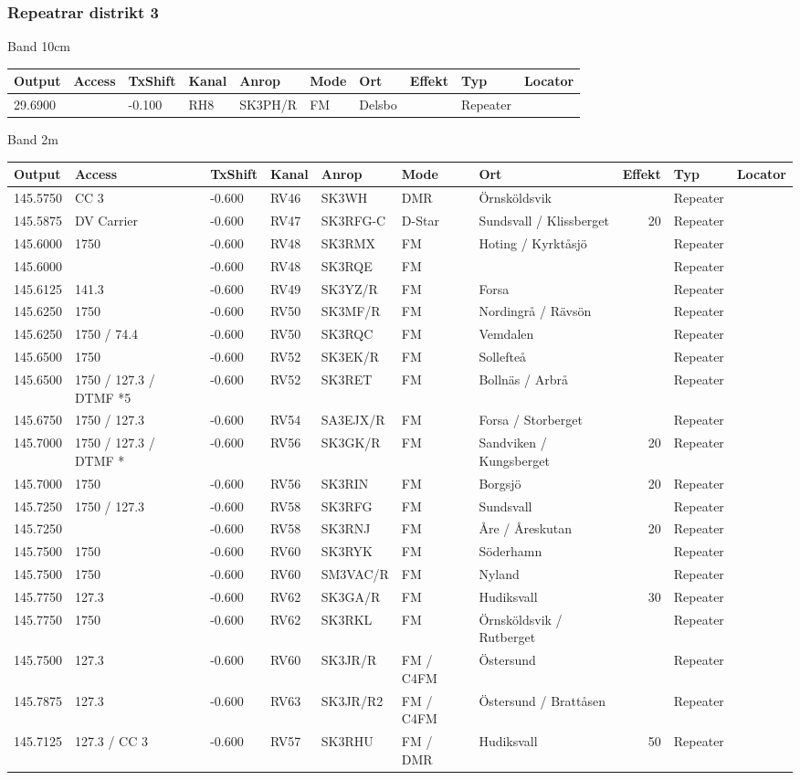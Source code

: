 \subsubsection{Repeatrar distrikt 3}
\large{Band 10cm}
\begin{longtable}{lllllllrlr}
Output & Access & TxShift & Kanal & Anrop & Mode & Ort & Effekt & Typ & Locator \\ \hline
29.6900&&-0.100&RH8&SK3PH/R&FM&Delsbo&&Repeater&\\
\end{longtable}
\large{Band 2m}
\begin{longtable}{lllllllrlr}
Output & Access & TxShift & Kanal & Anrop & Mode & Ort & Effekt & Typ & Locator \\ \hline
145.5750&CC 3&-0.600&RV46&SK3WH&DMR&Örnsköldsvik&&Repeater&\\
145.5875&DV Carrier&-0.600&RV47&SK3RFG-C&D-Star&Sundsvall / Klissberget&20&Repeater&\\
145.6000&1750&-0.600&RV48&SK3RMX&FM&Hoting / Kyrktåsjö&&Repeater&\\
145.6000&&-0.600&RV48&SK3RQE&FM&&&Repeater&\\
145.6125&141.3&-0.600&RV49&SK3YZ/R&FM&Forsa&&Repeater&\\
145.6250&1750&-0.600&RV50&SK3MF/R&FM&Nordingrå / Rävsön&&Repeater&\\
145.6250&1750 / 74.4&-0.600&RV50&SK3RQC&FM&Vemdalen&&Repeater&\\
145.6500&1750&-0.600&RV52&SK3EK/R&FM&Sollefteå&&Repeater&\\
145.6500&1750 / 127.3 / DTMF *5&-0.600&RV52&SK3RET&FM&Bollnäs / Arbrå&&Repeater&\\
145.6750&1750 / 127.3&-0.600&RV54&SA3EJX/R&FM&Forsa / Storberget&&Repeater&\\
145.7000&1750 / 127.3 / DTMF *&-0.600&RV56&SK3GK/R&FM&Sandviken / Kungsberget&20&Repeater&\\
145.7000&1750&-0.600&RV56&SK3RIN&FM&Borgsjö&20&Repeater&\\
145.7250&1750 / 127.3&-0.600&RV58&SK3RFG&FM&Sundsvall&&Repeater&\\
145.7250&&-0.600&RV58&SK3RNJ&FM&Åre / Åreskutan&20&Repeater&\\
145.7500&1750&-0.600&RV60&SK3RYK&FM&Söderhamn&&Repeater&\\
145.7500&1750&-0.600&RV60&SM3VAC/R&FM&Nyland&&Repeater&\\
145.7750&127.3&-0.600&RV62&SK3GA/R&FM&Hudiksvall&30&Repeater&\\
145.7750&1750&-0.600&RV62&SK3RKL&FM&Örnsköldsvik / Rutberget&&Repeater&\\
145.7500&127.3&-0.600&RV60&SK3JR/R&FM / C4FM&Östersund&&Repeater&\\
145.7875&127.3&-0.600&RV63&SK3JR/R2&FM / C4FM&Östersund / Brattåsen&&Repeater&\\
145.7125&127.3 / CC 3&-0.600&RV57&SK3RHU&FM / DMR&Hudiksvall&50&Repeater&\\
\end{longtable}
